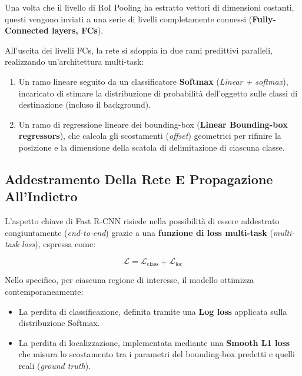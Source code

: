 ﻿\documentclass[11pt, a4paper]{article}
\begin{document}

Una volta che il livello di RoI Pooling ha estratto vettori di dimensioni costanti, questi vengono inviati a una serie di livelli completamente connessi (\textbf{Fully-Connected layers, FCs}).


All'uscita dei livelli FCs, la rete si sdoppia in due rami predittivi paralleli, realizzando un'architettura multi-task:
\begin{enumerate}
    \item Un ramo lineare seguito da un classificatore \textbf{Softmax} (\emph{Linear + softmax}), incaricato di stimare la distribuzione di probabilità dell'oggetto sulle classi di destinazione (incluso il background).
    \item Un ramo di regressione lineare dei bounding-box (\textbf{Linear Bounding-box regressors}), che calcola gli scostamenti (\emph{offset}) geometrici per rifinire la posizione e la dimensione della scatola di delimitazione di ciascuna classe.
\end{enumerate}


\newpage

\subsection{Addestramento Della Rete E Propagazione All'Indietro}

L'aspetto chiave di Fast R-CNN risiede nella possibilità di essere addestrato congiuntamente (\emph{end-to-end}) grazie a una \textbf{funzione di loss multi-task} (\emph{multi-task loss}), espressa come:

\[
\mathcal{L} = \mathcal{L}_{\text{class}} + \mathcal{L}_{\text{loc}}
\]

Nello specifico, per ciascuna regione di interesse, il modello ottimizza contemporaneamente:
\begin{itemize}
    \item La perdita di classificazione, definita tramite una \textbf{Log loss} applicata sulla distribuzione Softmax.
    \item La perdita di localizzazione, implementata mediante una \textbf{Smooth L1 loss} che misura lo scostamento tra i parametri del bounding-box predetti e quelli reali (\emph{ground truth}).
\end{itemize}
\end{document}
